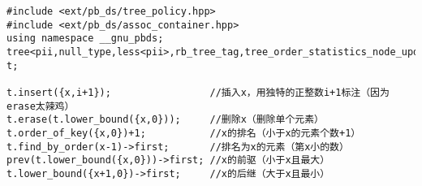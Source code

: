 \begin{lstlisting}
#include <ext/pb_ds/tree_policy.hpp>
#include <ext/pb_ds/assoc_container.hpp>
using namespace __gnu_pbds;
tree<pii,null_type,less<pii>,rb_tree_tag,tree_order_statistics_node_update> t;

t.insert({x,i+1});                 //插入x，用独特的正整数i+1标注（因为erase太辣鸡）
t.erase(t.lower_bound({x,0}));     //删除x（删除单个元素）
t.order_of_key({x,0})+1;           //x的排名（小于x的元素个数+1）
t.find_by_order(x-1)->first;       //排名为x的元素（第x小的数）
prev(t.lower_bound({x,0}))->first; //x的前驱（小于x且最大）
t.lower_bound({x+1,0})->first;     //x的后继（大于x且最小）
\end{lstlisting}